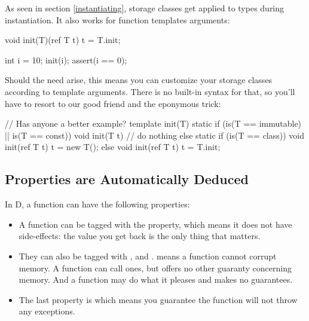 As seen in section \ref{instantiating}, storage classes get applied to types during instantiation. It also works for function templates arguments:

\begin{dcode}
void init(T)(ref T t)
{ 
    t = T.init;
}

int i = 10;
init(i);
assert(i == 0);
\end{dcode}

Should the need arise, this means you can customize your storage classes according to template arguments. There is no built-in syntax for that, so you'll have to resort to our good friend  and the eponymous trick:

\begin{dcode}
// Has anyone a better example?
template init(T)
{
    static if (is(T == immutable) || is(T == const))
        void init(T t) {} // do nothing
    else static if (is(T == class))
        void init(ref T t)
        {
            t = new T();
        }
    else 
        void init(ref T t)
        {
            t = T.init;
        }
}
\end{dcode}

\subsection{Properties are Automatically Deduced}\label{autodeduce}

In D, a function can have the following properties:

\begin{itemize}
\item A function can be tagged with the  property, which means it does not have side-effects: the value you get back is the only thing that matters. 
\item They can also be tagged with ,  and .  means a function cannot corrupt memory. A  function can call  ones, but offers no other guaranty concerning memory. And a  function may do what it pleases and makes no guarantees.
\item The last property is  which means you guarantee the function will not throw any exceptions.
\end{itemize}

